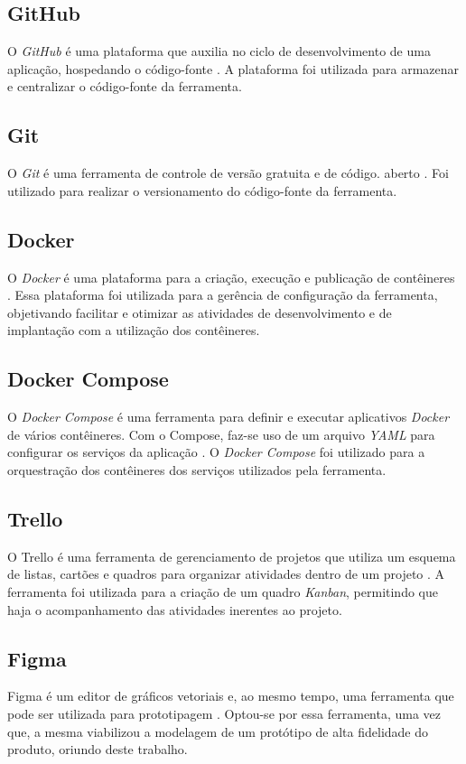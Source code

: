 \subsection{GitHub}
O \textit{GitHub} é uma plataforma que auxilia no ciclo de desenvolvimento de uma aplicação, hospedando o código-fonte \cite{github}. A plataforma foi utilizada para armazenar e centralizar o código-fonte da ferramenta.

\subsection{Git}
O \textit{Git} é uma ferramenta de controle de versão gratuita e de código. aberto \cite{git}. Foi utilizado para realizar o versionamento do código-fonte da ferramenta.

\subsection{Docker}
O \textit{Docker} é uma plataforma para a criação, execução e publicação de contêineres \cite{docker}. Essa plataforma foi utilizada para a gerência de configuração da ferramenta, objetivando facilitar e otimizar as atividades de desenvolvimento e de implantação com a utilização dos contêineres.

\subsection{Docker Compose}
O \textit{Docker Compose} é uma ferramenta para definir e executar aplicativos \textit{Docker} de vários contêineres. Com o Compose, faz-se uso de um arquivo \textit{YAML} para configurar os serviços da aplicação \cite{docker-compose}. O \textit{Docker Compose} foi utilizado para a orquestração dos contêineres dos serviços utilizados pela ferramenta.

\subsection{Trello}
O Trello é uma ferramenta de gerenciamento de projetos que utiliza um esquema de listas, cartões e quadros para organizar atividades dentro de um projeto \cite{trello}. A ferramenta foi utilizada para a criação de um quadro \textit{Kanban}, permitindo que haja o acompanhamento das atividades inerentes ao projeto.

\subsection{Figma}
Figma é um editor de gráficos vetoriais e, ao mesmo tempo, uma ferramenta que pode ser utilizada para prototipagem \cite{figma}. Optou-se por essa ferramenta, uma vez que, a mesma viabilizou a modelagem de um protótipo de alta fidelidade do produto, oriundo deste trabalho.

